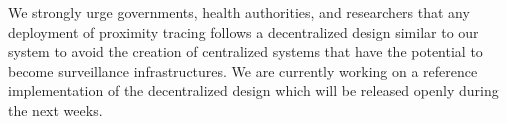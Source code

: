 \documentclass[10.8pt,a4paper]{article}
\begin{document}
We strongly urge governments, health authorities, and researchers that any deployment of proximity tracing follows a decentralized design similar to our system to avoid the creation of centralized systems that  have the potential to become surveillance infrastructures.  We are currently working on a reference implementation of the decentralized design which will be released openly during the next weeks.
\end{document}
